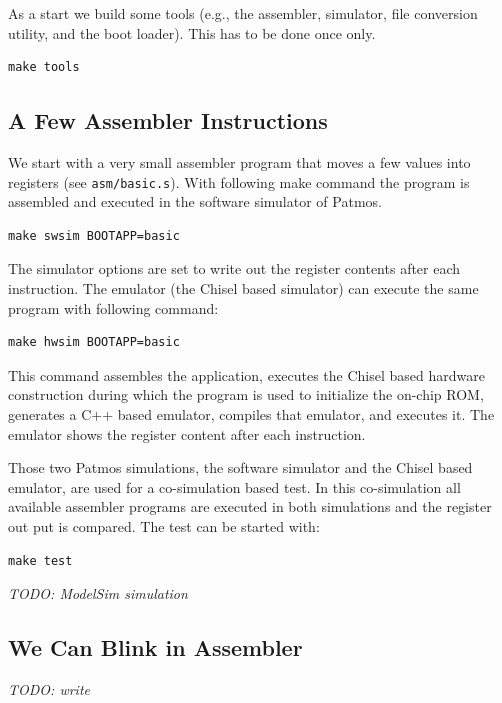 \documentclass[a4paper,fontsize=10pt,twoside,DIV15,BCOR12mm,headinclude=true,footinclude=false,pagesize,bibtotoc]{scrbook}
\newcommand{\code}[1]{{\texttt{#1}}}
\newcommand{\todo}[1]{{\emph{TODO: #1}}}
\begin{document}
As a start we build some tools (e.g., the assembler, simulator, file conversion
utility, and the boot loader). This has to be done once only.

\begin{verbatim}
make tools
\end{verbatim}

\subsection{A Few Assembler Instructions}

We start with a very small assembler program that moves a few values into registers
(see \code{asm/basic.s}). With following make command the program is assembled
and executed in the software simulator of Patmos.

\begin{verbatim}
make swsim BOOTAPP=basic
\end{verbatim}

The simulator options are set to write out the register contents after each instruction.
The emulator (the Chisel based simulator) can execute the same program
with following command:

\begin{verbatim}
make hwsim BOOTAPP=basic
\end{verbatim}

This command assembles the application, executes the Chisel based hardware
construction during which the program is used to initialize the on-chip ROM,
generates a C++ based emulator, compiles that emulator, and executes it.
The emulator shows the register content after each instruction.

Those two Patmos simulations, the software simulator and the Chisel based emulator,
are used for a co-simulation based test. In this co-simulation all available assembler
programs are executed in both simulations and the register out put is compared.
The test can be started with:

\begin{verbatim}
make test
\end{verbatim}


\todo{ModelSim simulation}

\subsection{We Can Blink in Assembler}

\todo{write}
\end{document}
